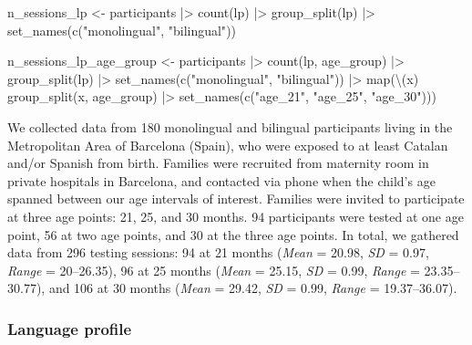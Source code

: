 \documentclass[
  letterpaper,
  DIV=11,
  numbers=noendperiod]{scrartcl}
\newenvironment{Shaded}{\begin{snugshade}}{\end{snugshade}}
\newcommand{\FunctionTok}[1]{\textcolor[rgb]{0.28,0.35,0.67}{#1}}
\newcommand{\NormalTok}[1]{\textcolor[rgb]{0.00,0.23,0.31}{#1}}
\newcommand{\OtherTok}[1]{\textcolor[rgb]{0.00,0.23,0.31}{#1}}
\newcommand{\SpecialCharTok}[1]{\textcolor[rgb]{0.37,0.37,0.37}{#1}}
\newcommand{\StringTok}[1]{\textcolor[rgb]{0.13,0.47,0.30}{#1}}
\begin{document}
\begin{Shaded}
\begin{Highlighting}[]
\NormalTok{n\_sessions\_lp }\OtherTok{\textless{}{-}}\NormalTok{ participants }\SpecialCharTok{|\textgreater{}} 
    \FunctionTok{count}\NormalTok{(lp) }\SpecialCharTok{|\textgreater{}} 
    \FunctionTok{group\_split}\NormalTok{(lp) }\SpecialCharTok{|\textgreater{}} 
    \FunctionTok{set\_names}\NormalTok{(}\FunctionTok{c}\NormalTok{(}\StringTok{"monolingual"}\NormalTok{, }\StringTok{"bilingual"}\NormalTok{))}

\NormalTok{n\_sessions\_lp\_age\_group }\OtherTok{\textless{}{-}}\NormalTok{ participants }\SpecialCharTok{|\textgreater{}} 
    \FunctionTok{count}\NormalTok{(lp, age\_group) }\SpecialCharTok{|\textgreater{}} 
    \FunctionTok{group\_split}\NormalTok{(lp) }\SpecialCharTok{|\textgreater{}} 
    \FunctionTok{set\_names}\NormalTok{(}\FunctionTok{c}\NormalTok{(}\StringTok{"monolingual"}\NormalTok{, }\StringTok{"bilingual"}\NormalTok{)) }\SpecialCharTok{|\textgreater{}} 
    \FunctionTok{map}\NormalTok{(\textbackslash{}(x) }\FunctionTok{group\_split}\NormalTok{(x, age\_group) }\SpecialCharTok{|\textgreater{}} 
            \FunctionTok{set\_names}\NormalTok{(}\FunctionTok{c}\NormalTok{(}\StringTok{"age\_21"}\NormalTok{, }\StringTok{"age\_25"}\NormalTok{, }\StringTok{"age\_30"}\NormalTok{)))}
\end{Highlighting}
\end{Shaded}

We collected data from 180 monolingual and bilingual participants living
in the Metropolitan Area of Barcelona (Spain), who were exposed to at
least Catalan and/or Spanish from birth. Families were recruited from
maternity room in private hospitals in Barcelona, and contacted via
phone when the child's age spanned between our age intervals of
interest. Families were invited to participate at three age points: 21,
25, and 30 months. 94 participants were tested at one age point, 56 at
two age points, and 30 at the three age points. In total, we gathered
data from 296 testing sessions: 94 at 21 months (\emph{Mean} = 20.98,
\emph{SD} = 0.97, \emph{Range} = 20--26.35), 96 at 25 months
(\emph{Mean} = 25.15, \emph{SD} = 0.99, \emph{Range} = 23.35--30.77),
and 106 at 30 months (\emph{Mean} = 29.42, \emph{SD} = 0.99,
\emph{Range} = 19.37--36.07).

\hypertarget{sec-lp}{%
\subsubsection{Language profile}\label{sec-lp}}
\end{document}
